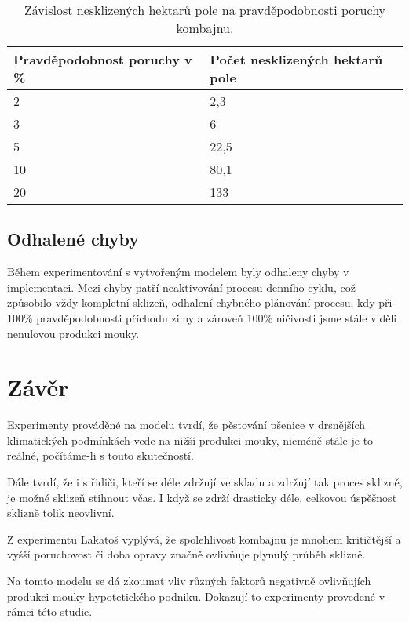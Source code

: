 \documentclass[a4paper, 11pt, hidelinks]{article}
\begin{document}
\begin{table}[ht]
    \centering
    \begin{tabularx}{\textwidth}{|X|X|}
      \hline
      \textbf{Pravděpodobnost poruchy v \%} & \textbf{Počet nesklizených hektarů pole} \\
      \hline
      2 & 2,3 \\
      \hline
      3 & 6 \\
      \hline
      5 & 22,5 \\
      \hline
      10 & 80,1 \\
      \hline
      20 & 133 \\
      \hline
    \end{tabularx}
    \caption{Závislost nesklizených hektarů pole na pravděpodobnosti poruchy kombajnu.}
    \label{tab:lakatosě}
\end{table}

\subsection{Odhalené chyby}\label{4_3_chyby}

Během experimentování s vytvořeným modelem byly odhaleny chyby v implementaci.
Mezi chyby patří neaktivování procesu denního cyklu, což způsobilo vždy kompletní sklizeň, odhalení chybného plánování procesu, kdy při 100\% pravděpodobnosti příchodu zimy a zároveň 100\% ničivosti jsme stále viděli nenulovou produkci mouky. 

\section{Závěr}\label{5_zaver}

Experimenty prováděné na modelu tvrdí, že pěstování pšenice v drsnějších klimatických podmínkách vede na nižší produkci mouky, nicméně stále je to reálné, počítáme-li s touto skutečností.

Dále tvrdí, že i s řidiči, kteří se déle zdržují ve skladu a zdržují tak proces sklizně, je možné sklizeň stihnout včas.
I když se zdrží drasticky déle, celkovou úspěšnost sklizně tolik neovlivní.

Z experimentu Lakatoš vyplývá, že spolehlivost kombajnu je mnohem kritičtější a vyšší poruchovost či doba opravy značně ovlivňuje plynulý průběh sklizně.

Na tomto modelu se dá zkoumat vliv různých faktorů negativně ovlivňujích produkci mouky hypotetického podniku.
Dokazují to experimenty provedené v rámci této studie.

\newpage


\end{document}
